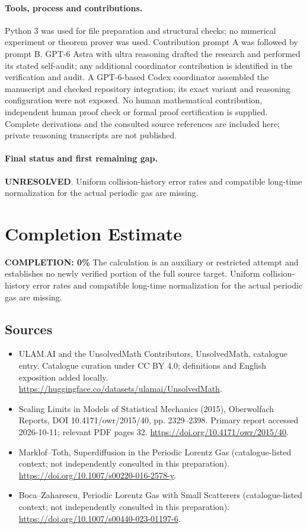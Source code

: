 \documentclass[11pt]{article}
\begin{document}
\paragraph{Tools, process and contributions.}
Python 3 was used for file preparation and structural checks; no numerical experiment or theorem prover was used. Contribution prompt A was followed by prompt B. GPT-6 Astra with ultra reasoning drafted the research and performed its stated self-audit; any additional coordinator contribution is identified in the verification and audit. A GPT-6-based Codex coordinator assembled the manuscript and checked repository integration; its exact variant and reasoning configuration were not exposed. No human mathematical contribution, independent human proof check or formal proof certification is supplied. Complete derivations and the consulted source references are included here; private reasoning transcripts are not published.

\paragraph{Final status and first remaining gap.}
\textbf{UNRESOLVED}. Uniform collision-history error rates and compatible long-time normalization for the actual periodic gas are missing.

\section{Completion Estimate}
\noindent\textbf{COMPLETION: 0\%}
The calculation is an auxiliary or restricted attempt and establishes no newly verified portion of the full source target. Uniform collision-history error rates and compatible long-time normalization for the actual periodic gas are missing.

\subsection{Sources}
\begin{itemize}
\item[\hypertarget{source:statement:1}{S1}] ULAM.AI and the UnsolvedMath Contributors, UnsolvedMath, catalogue entry. Catalogue curation under CC BY 4.0; definitions and English exposition added locally.
\url{https://huggingface.co/datasets/ulamai/UnsolvedMath}.
\item[\hypertarget{source:statement:2}{S2}] Scaling Limits in Models of Statistical Mechanics (2015), Oberwolfach Reports, DOI 10.4171/owr/2015/40, pp. 2329--2398. Primary report accessed 2026-10-11; relevant PDF pages 32.
\url{https://doi.org/10.4171/owr/2015/40}.
\item[\hypertarget{source:statement:3}{S3}] Marklof--Toth, Superdiffusion in the Periodic Lorentz Gas (catalogue-listed context; not independently consulted in this preparation).
\url{https://doi.org/10.1007/s00220-016-2578-y}.
\item[\hypertarget{source:statement:4}{S4}] Boca--Zaharescu, Periodic Lorentz Gas with Small Scatterers (catalogue-listed context; not independently consulted in this preparation).
\url{https://doi.org/10.1007/s00440-023-01197-6}.
\end{itemize}
\label{end:statement}
\end{document}
